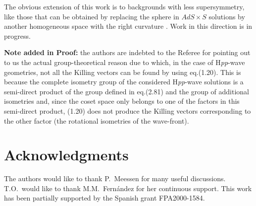 \documentclass[12pt,a4paper]{article}
\begin{document}
The obvious extension of this work is to backgrounds with less
supersymmetry, like those that can be obtained by replacing the sphere
in $AdS\times S$ solutions by another homogeneous space with the right
curvature \cite{Castellani:1983yg,Duff:1995wk,Castellani:1998nz}. Work
in this direction is in progress.

{\bf Note added in Proof:} the authors are indebted to the Referee for
pointing out to us the actual group-theoretical reason due to which,
in the case of H{\em pp}-wave geometries, not all the Killing vectors
can be found by using eq.(1.20). This is because the complete isometry
group of the considered H{\em pp}-wave solutions is a semi-direct
product of the group defined in eq.(2.81) and the group of additional
isometries and, since the coset space only belongs to one of the
factors in this semi-direct product, (1.20) does not produce the
Killing vectors corresponding to the other factor (the rotational
isometries of the wave-front). \\

\vspace{1cm}

\section*{Acknowledgments}

The authors would like to thank P.~Meessen for many useful
discussions.  T.O.~would like to thank M.M.~Fern\'andez for her
continuous support.  This work has been partially supported by the
Spanish grant FPA2000-1584.

\end{document}
